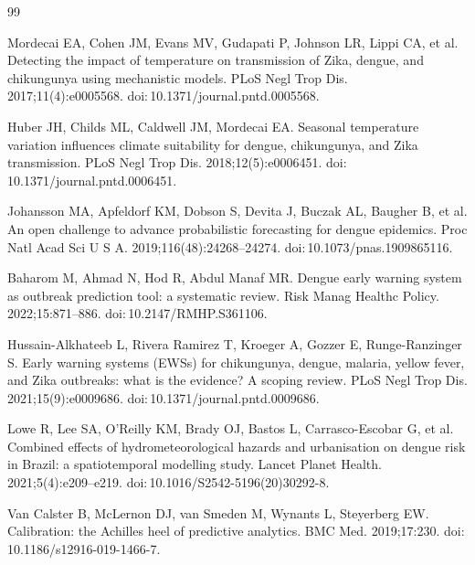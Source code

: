 \documentclass[11pt,a4paper]{article}
\begin{document}
\begingroup
{}
\begin{thebibliography}{99}
\setlength{\itemsep}{0pt}\setlength{\parskip}{0pt}

 Mordecai EA, Cohen JM, Evans MV, Gudapati P, Johnson LR, Lippi CA, et al. Detecting the impact of temperature on transmission of Zika, dengue, and chikungunya using mechanistic models. PLoS Negl Trop Dis. 2017;11(4):e0005568. doi:\,10.1371/journal.pntd.0005568.

 Huber JH, Childs ML, Caldwell JM, Mordecai EA. Seasonal temperature variation influences climate suitability for dengue, chikungunya, and Zika transmission. PLoS Negl Trop Dis. 2018;12(5):e0006451. doi:\,10.1371/journal.pntd.0006451.

 Johansson MA, Apfeldorf KM, Dobson S, Devita J, Buczak AL, Baugher B, et al. An open challenge to advance probabilistic forecasting for dengue epidemics. Proc Natl Acad Sci U S A. 2019;116(48):24268--24274. doi:\,10.1073/pnas.1909865116.

 Baharom M, Ahmad N, Hod R, Abdul Manaf MR. Dengue early warning system as outbreak prediction tool: a systematic review. Risk Manag Healthc Policy. 2022;15:871--886. doi:\,10.2147/RMHP.S361106.

 Hussain-Alkhateeb L, Rivera Ramirez T, Kroeger A, Gozzer E, Runge-Ranzinger S. Early warning systems (EWSs) for chikungunya, dengue, malaria, yellow fever, and Zika outbreaks: what is the evidence? A scoping review. PLoS Negl Trop Dis. 2021;15(9):e0009686. doi:\,10.1371/journal.pntd.0009686.

 Lowe R, Lee SA, O'Reilly KM, Brady OJ, Bastos L, Carrasco-Escobar G, et al. Combined effects of hydrometeorological hazards and urbanisation on dengue risk in Brazil: a spatiotemporal modelling study. Lancet Planet Health. 2021;5(4):e209--e219. doi:\,10.1016/S2542-5196(20)30292-8.

 Van Calster B, McLernon DJ, van Smeden M, Wynants L, Steyerberg EW. Calibration: the Achilles heel of predictive analytics. BMC Med. 2019;17:230. doi:\,10.1186/s12916-019-1466-7.


\end{thebibliography}
\end{document}
